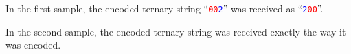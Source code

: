 \nextsample

In the first sample, the encoded ternary string ``\textcolor{red}{\texttt{00}}\textcolor{blue}{\texttt{2}}'' was received as ``\textcolor{blue}{\texttt{2}}\textcolor{red}{\texttt{00}}''.

\nextsample

In the second sample, the encoded ternary string was received exactly the way it was encoded.